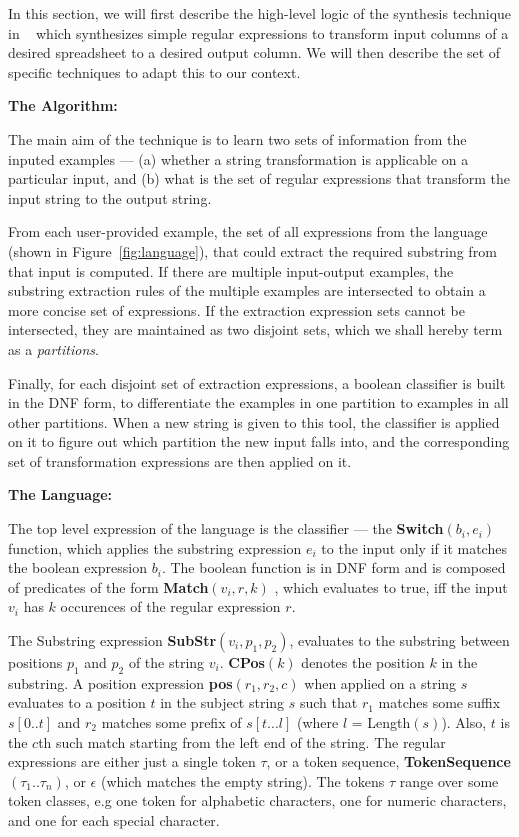 In this section, we will first describe the high-level logic of the synthesis technique in ~\cite{gulwani} which synthesizes simple regular expressions to transform input columns of a desired spreadsheet to a desired output column. We will then describe the set of specific techniques to adapt this to our context. 

{\bf The Algorithm:}

The main aim of the technique is to learn two sets of information from the inputed examples --- (a) whether a string transformation is applicable on a particular input, and (b) what is the set of regular expressions that transform the input string to the output string.

From each user-provided example, the set of all expressions from the language (shown in Figure~\ref{fig:language}), that could extract the required substring from that input is computed. If there are multiple input-output examples, the substring extraction rules of the multiple examples are intersected to obtain a more concise set of expressions. If the extraction expression sets cannot be intersected, they are maintained as two disjoint sets, which we shall hereby term as a {\it partitions}. 

Finally, for each disjoint set of extraction expressions, a boolean classifier is built in the DNF form, to differentiate the examples in one partition to examples in all other partitions. When a new string is given to this tool, the classifier is applied on it to figure out which partition the new input falls into, and the corresponding set of transformation expressions are then applied on it.

{\bf The Language:}

The top level expression of the language is the classifier --- the {\bf Switch}$(b_i,e_i)$ function, which applies the substring expression $e_i$ to the input only if it matches the boolean expression $b_i$. The boolean function is in DNF form and is composed of predicates of the form {\bf Match}$(v_i,r,k)$ , which evaluates to true, iff the input $v_i$ has $k$ occurences of the regular expression $r$.

The Substring expression {\bf SubStr}$(v_i,p_1,p_2)$, evaluates to the substring between positions $p_1$ and $p_2$ of the string $v_i$. {\bf CPos}$(k)$ denotes the position $k$ in the substring. A position expression {\bf pos}$(r_1,r_2,c)$ when applied on a string $s$ evaluates to a position $t$ in the subject string $s$ such that $r_1$ matches some suffix $s[0 ..t]$ and $r_2$ matches some prefix of $s[t ... l]$ (where $l$ = Length$(s)$). Also, $t$ is the $c$th such match starting from the left end of the string. The regular expressions are either just a single token $\tau$, or a token sequence, {\bf TokenSequence}$(\tau_1 .. \tau_n)$, or $\epsilon$ (which matches the empty string). The tokens $\tau$ range over some token classes, e.g one token for alphabetic characters, one for numeric characters, and one for each special character. 


